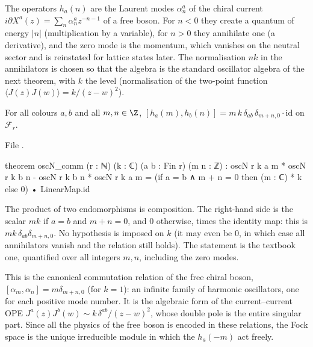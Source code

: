 \begin{physics}
The operators $h_a(n)$ are the Laurent modes $\alpha^a_n$ of the chiral current $i\partial X^a(z)=\sum_n\alpha^a_nz^{-n-1}$ of a free boson. For $n<0$ they create a quantum of energy $|n|$ (multiplication by a variable), for $n>0$ they annihilate one (a derivative), and the zero mode is the momentum, which vanishes on the neutral sector and is reinstated for lattice states later. The normalisation $nk$ in the annihilators is chosen so that the algebra is the standard oscillator algebra of the next theorem, with $k$ the level (normalisation of the two-point function $\langle J(z)J(w)\rangle=k/(z-w)^2$).
\end{physics}

\begin{theorem}\label{ch03:thm:oscN_comm}
For all colours $a,b$ and all $m,n\in\Z$,
$[h_a(m),h_b(n)] = m\,k\,\delta_{ab}\,\delta_{m+n,0}\cdot\mathrm{id}$ on $\mathcal F_r$.
\end{theorem}

\noindent File .
\begin{leancode}
theorem oscN_comm (r : ℕ) (k : ℂ) (a b : Fin r) (m n : ℤ) :
    oscN r k a m * oscN r k b n - oscN r k b n * oscN r k a m
      = (if a = b ∧ m + n = 0 then (m : ℂ) * k else 0) • LinearMap.id
\end{leancode}

\begin{dictionary}
The product \lean{*} of two endomorphisms is composition. The right-hand side is the scalar
$mk$ if $a=b$ and $m+n=0$, and $0$ otherwise, times the identity map: this is
$mk\,\delta_{ab}\delta_{m+n,0}$. No hypothesis is imposed on $k$ (it may even be $0$, in which case
all annihilators vanish and the relation still holds). The statement is the textbook one,
quantified over all integers $m,n$, including the zero modes.
\end{dictionary}

\begin{physics}
This is the canonical commutation relation of the free chiral boson, $[\alpha_m,\alpha_n]=m\delta_{m+n,0}$ (for $k=1$): an infinite family of harmonic oscillators, one for each positive mode number. It is the algebraic form of the current--current OPE $J^a(z)J^b(w)\sim k\,\delta^{ab}/(z-w)^2$, whose double pole is the entire singular part. Since all the physics of the free boson is encoded in these relations, the Fock space is the unique irreducible module in which the $h_a(-m)$ act freely.
\end{physics}

